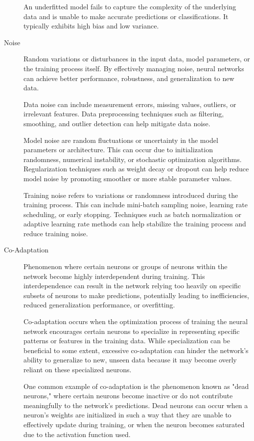 \documentclass[a4paper]{article}
\begin{document}
\begin{description}
An underfitted model fails to capture the complexity of the underlying data and is unable to make accurate predictions or classifications. It typically exhibits high bias and low variance.

\item[Noise]
Random variations or disturbances in the input data, model parameters, or the training process itself. By effectively managing noise, neural networks can achieve better performance, robustness, and generalization to new data.

Data noise can include measurement errors, missing values, outliers, or irrelevant features. Data preprocessing techniques such as filtering, smoothing, and outlier detection can help mitigate data noise. 

Model noise are random fluctuations or uncertainty in the model parameters or architecture. This can occur due to initialization randomness, numerical instability, or stochastic optimization algorithms. Regularization techniques such as weight decay or dropout can help reduce model noise by promoting smoother or more stable parameter values.

Training noise refers to variations or randomness introduced during the training process. This can include mini-batch sampling noise, learning rate scheduling, or early stopping. Techniques such as batch normalization or adaptive learning rate methods can help stabilize the training process and reduce training noise.

\item[Co-Adaptation]
Phenomenon where certain neurons or groups of neurons within the network become highly interdependent during training. This interdependence can result in the network relying too heavily on specific subsets of neurons to make predictions, potentially leading to inefficiencies, reduced generalization performance, or overfitting.

Co-adaptation occurs when the optimization process of training the neural network encourages certain neurons to specialize in representing specific patterns or features in the training data. While specialization can be beneficial to some extent, excessive co-adaptation can hinder the network's ability to generalize to new, unseen data because it may become overly reliant on these specialized neurons.

One common example of co-adaptation is the phenomenon known as "dead neurons," where certain neurons become inactive or do not contribute meaningfully to the network's predictions. Dead neurons can occur when a neuron's weights are initialized in such a way that they are unable to effectively update during training, or when the neuron becomes saturated due to the activation function used.


\end{description}
\end{document}
